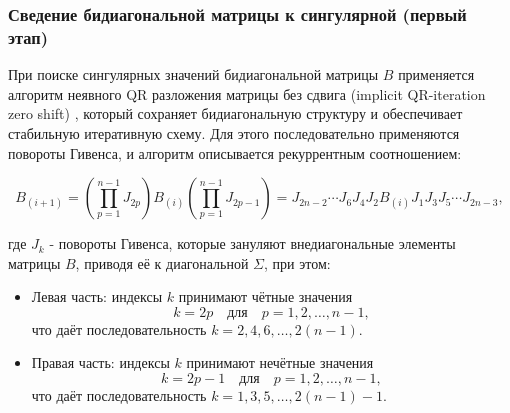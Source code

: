 \subsubsection{Сведение бидиагональной матрицы к сингулярной (первый этап)}
При поиске сингулярных значений бидиагональной матрицы $B$ применяется алгоритм неявного QR разложения матрицы без сдвига (implicit QR-iteration zero shift) \cite{Demmel1990}, который сохраняет бидиагональную структуру и обеспечивает стабильную итеративную схему.
Для этого последовательно применяются повороты Гивенса, и алгоритм описывается рекуррентным соотношением:

\begin{equation}
B_{(i+1)} = \left( \prod_{p=1}^{n-1} J_{2p} \right) B_{(i)} \left( \prod_{p=1}^{n-1} J_{2p-1} \right) = J_{2n-2} \cdots J_6 J_4 J_2 B_{(i)} J_1 J_3 J_5 \cdots J_{2n-3}, \label{to_bidiag_reccur}
\end{equation}

где \( J_k \) - повороты Гивенса, которые зануляют внедиагональные элементы матрицы \( B \), приводя её к диагональной \( \Sigma \), при этом:
 \begin{itemize}
     \item Левая часть: индексы $k$ принимают чётные значения
     \begin{equation}
     k = 2p \quad \text{для} \quad p = 1,2,\ldots,n-1,
     \end{equation}
     что даёт последовательность $k = 2,4,6,\ldots,2(n-1)$.
 
     \item Правая часть: индексы $k$ принимают нечётные значения
     \begin{equation}
     k = 2p-1 \quad \text{для} \quad p = 1,2,\ldots,n-1,
     \end{equation}
     что даёт последовательность $k = 1,3,5,\ldots,2(n-1)-1$.
 \end{itemize}

